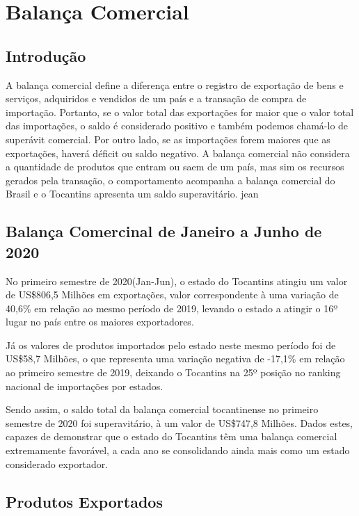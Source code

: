\chapter{Balança Comercial}
\section{Introdução}
\par A balança comercial define a diferença entre o registro de exportação de bens e serviços, adquiridos e vendidos de um país e a transação de compra de importação. Portanto, se o valor total das exportações for maior que o valor total das importações, o saldo é considerado positivo e também podemos chamá-lo de superávit comercial. Por outro lado, se as importações forem maiores que as exportações, haverá déficit ou saldo negativo. A balança comercial não considera a quantidade de produtos que entram ou saem de um país, mas sim os recursos gerados pela transação, o comportamento acompanha a balança comercial do Brasil e o Tocantins apresenta um saldo superavitário.
jean 

\section{Balança Comercinal de Janeiro a Junho de 2020}
\par No primeiro semestre de 2020(Jan-Jun), o estado do Tocantins atingiu um valor de US\$806,5 Milhões em exportações, valor correspondente à uma variação de 40,6\% em relação ao mesmo período de 2019, levando o estado a atingir o 16º lugar no país entre os maiores exportadores. 

\par Já os valores de produtos importados pelo estado neste mesmo período foi de US\$58,7 Milhões, o que representa uma variação negativa de -17,1\% em relação ao primeiro semestre de 2019, deixando o Tocantins na 25º posição no ranking nacional de importações por estados.

\par Sendo assim, o saldo total da balança comercial tocantinense no primeiro semestre de 2020 foi superavitário, à um valor de US\$747,8 Milhões. Dados estes, capazes de demonstrar que o estado do Tocantins têm uma balança comercial extremamente favorável, a cada ano se consolidando ainda mais como um estado considerado exportador.

\section{Produtos Exportados}
